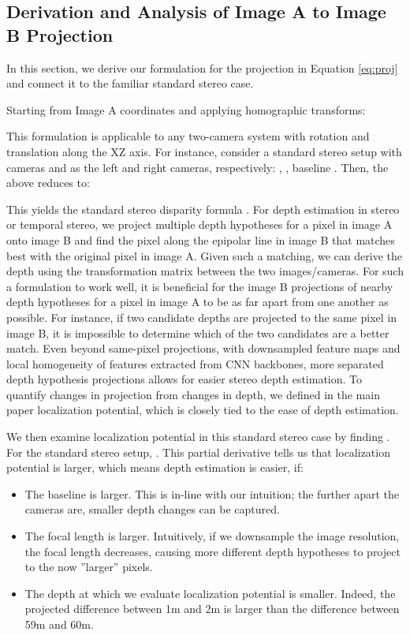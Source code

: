 \documentclass[runningheads, hyperfootnotes=false]{article}
\begin{document}
\subsection{Derivation and Analysis of Image A to Image B Projection}\label{app:theory_proj}
In this section, we derive our formulation for the projection  in Equation \ref{eq:proj} and connect it to the familiar standard stereo case. 

Starting from Image A coordinates  and applying homographic transforms:




This formulation is applicable to any two-camera system with rotation and translation along the XZ axis. For instance, consider a standard stereo setup with cameras  and  as the left and right cameras, respectively: , , baseline . Then, the above reduces to:

This yields the standard stereo disparity formula . For depth estimation in stereo or temporal stereo, we project multiple depth hypotheses for a pixel in image A onto image B and find the pixel along the epipolar line in image B that matches best with the original pixel in image A. Given such a matching, we can derive the depth using the transformation matrix between the two images/cameras. For such a formulation to work well, it is beneficial for the image B projections of nearby depth hypotheses for a pixel in image A to be as far apart from one another as possible. For instance, if two candidate depths are projected to the same pixel in image B, it is impossible to determine which of the two candidates are a better match. Even beyond same-pixel projections, with downsampled feature maps and local homogeneity of features extracted from CNN backbones, more separated depth hypothesis projections allows for easier stereo depth estimation. To quantify changes in projection from changes in depth, we defined in the main paper localization potential, which is closely tied to the ease of depth estimation.

We then examine localization potential in this standard stereo case by finding . For the standard stereo setup, . This partial derivative tells us that localization potential is larger, which means depth estimation is easier, if:
\begin{itemize}
    \item The baseline  is larger. This is in-line with our intuition; the further apart the cameras are, smaller depth changes can be captured. 
    \item The focal length  is larger. Intuitively, if we downsample the image resolution, the focal length decreases, causing more different depth hypotheses to project to the now ''larger'' pixels.
    \item The depth at which we evaluate localization potential is smaller. Indeed, the projected difference between 1m and 2m is larger than the difference between 59m and 60m.
\end{itemize}
\end{document}
